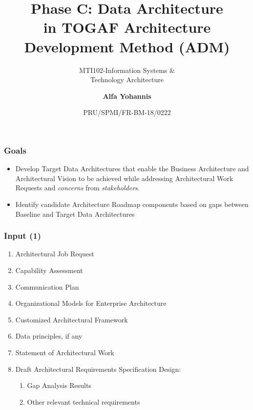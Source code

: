 \documentclass[aspectratio=169, table]{beamer}
\subtitle{MTI102-Information Systems \&\\Technology Architecture}
\title{\Large Phase C: Data Architecture\\in TOGAF
    Architecture\\Development Method (ADM)}
\date[Serial]{\scriptsize {PRU/SPMI/FR-BM-18/0222}}
\author[Pradita]{\small {\textbf{Alfa Yohannis}}}
\begin{document}
    \frame{\titlepage}

    \begin{frame}
        \frametitle{Goals}
        \begin{itemize}
            \item Develop Target Data Architectures that enable the Business Architecture and Architectural Vision to be achieved while addressing Architectural Work Requests and \textit{concerns} from \textit{stakeholders}.
            \item Identify candidate Architecture Roadmap components based on gaps between Baseline and Target Data Architectures
        \end{itemize}
    \end{frame}

    \begin{frame}
        \frametitle{Input (1)}
        \vspace{20pt}
        \begin{enumerate}
            \item Architectural Job Request
            \item Capability Assessment
            \item Communication Plan
            \item Organizational Models for Enterprise Architecture
            \item Customized Architectural Framework
            \item Data principles, if any
            \item Statement of Architectural Work
            \item Draft Architectural Requirements Specification Design:
            \begin{enumerate}
                \item Gap Analysis Results
                \item Other relevant technical requirements
            \end{enumerate}
        \end{enumerate}
    \end{frame}
\end{document}
